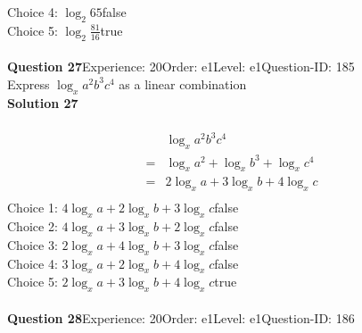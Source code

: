 \documentclass{article}
\begin{document}
Choice 4: \hspace{20pt}$\log_{2}65$\hspace{20pt}false\\
Choice 5: \hspace{20pt}$\log_{2}\displaystyle\frac{81}{16}$\hspace{20pt}true\\
\\[4pt]
\noindent\textbf{Question 27}\hspace{20pt}Experience: 20\hspace{20pt}Order: e1\hspace{20pt}Level: e1\hspace{20pt}Question-ID: 185\\[2pt]
Express $\log_{x}a^2b^3c^4$ as a linear combination\\[4pt]
\noindent\textbf{Solution 27}\\[2pt]
\\[-35pt]\begin{align*}
&\log_{x}a^2b^3c^4\\[2pt]
=&\log_{x}a^2+\log_{x}b^3+\log_{x}c^4\\[2pt]
=&2\log_{x}a+3\log_{x}b+4\log_{x}c\\[-30pt]
\end{align*}
Choice 1: \hspace{20pt}$4\log_{x}a+2\log_{x}b+3\log_{x}c$\hspace{20pt}false\\
Choice 2: \hspace{20pt}$4\log_{x}a+3\log_{x}b+2\log_{x}c$\hspace{20pt}false\\
Choice 3: \hspace{20pt}$2\log_{x}a+4\log_{x}b+3\log_{x}c$\hspace{20pt}false\\
Choice 4: \hspace{20pt}$3\log_{x}a+2\log_{x}b+4\log_{x}c$\hspace{20pt}false\\
Choice 5: \hspace{20pt}$2\log_{x}a+3\log_{x}b+4\log_{x}c$\hspace{20pt}true\\
\\[4pt]
\noindent\textbf{Question 28}\hspace{20pt}Experience: 20\hspace{20pt}Order: e1\hspace{20pt}Level: e1\hspace{20pt}Question-ID: 186\\[2pt]
\end{document}
